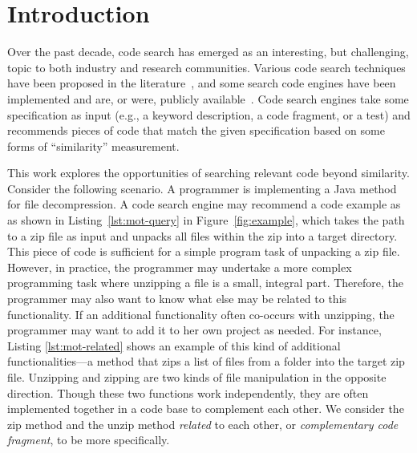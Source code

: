 \section{Introduction}
\label{sec:intro}
Over the past decade, code search has emerged as an interesting, but
challenging, topic to both industry and research communities. Various code search
techniques have been proposed in the
literature~\cite{bajracharya2009sourcerer,reiss2009semantics,lazzarini2009applying,mcmillan2012exemplar}, and
some search code engines have been implemented and are, or were, publicly
available~\cite{googlesearch, github,codase,krugle,ohloh,searchcode}. Code search engines 
take some specification as input (e.g., a keyword description, a code fragment, or a test) and 
recommends pieces of code that match the given specification based on some forms of ``similarity'' measurement.


This work explores the opportunities of searching relevant code beyond similarity. Consider
the following scenario. A programmer is implementing a Java method for
file decompression. A code search engine may recommend a code example as as shown in 
Listing~\ref{lst:mot-query} in Figure~\ref{fig:example}, which takes the path to a zip file as input and
unpacks all files within the zip into a target directory.  This piece of code is sufficient for 
a simple program task of unpacking a zip file. However, in practice, the programmer 
may undertake a more complex programming task where unzipping a file is a small,
integral part. Therefore, the programmer may also want to know what else may be
related to this functionality. 
 If an additional functionality often co-occurs with unzipping, the programmer may want to add it
to her own project as needed. 
For instance, Listing \ref{lst:mot-related} shows an example of this kind of additional 
functionalities---a method that zips a list of files from a folder into the target zip file. Unzipping
and zipping are two kinds of file manipulation in the opposite direction. 
Though these two functions work independently, they are often implemented together in a code base to complement each other. We consider the zip method and the unzip method {\em related} to each other, or {\em complementary code fragment}, to be more specifically.

